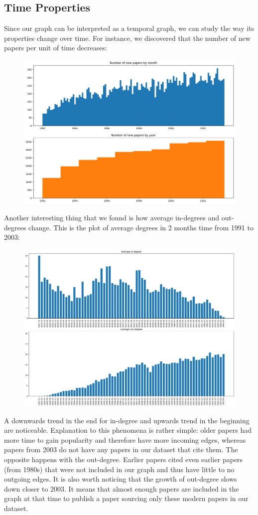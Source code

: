 \documentclass{article}
\newcommand\tab[1][1cm]{\hspace*{#1}}
\begin{document}
\subsection{Time Properties}
\tab Since our graph can be interpreted as a temporal graph, we can study the way its properties change over time. For instance, we discovered that the number of new papers per unit of time decreases:
\begin{figure}[h]
\centering
\includegraphics[width=0.9\linewidth]{new_papers_over_time.png}
\end{figure}
\newpage
Another interesting thing that we found is how average in-degrees and out-degrees change. This is the plot of average degrees in 2 months time from 1991 to 2003:
\begin{figure}[h]
\centering
\includegraphics[width=1\linewidth]{degrees_over_time.png}
\end{figure}
A downwards trend in the end for in-degree and upwards trend in the beginning are noticeable. Explanation to this phenomena is rather simple: older papers had more time to gain popularity and therefore have more incoming edges, whereas papers from 2003 do not have any papers in our dataset that cite them. The opposite happens with the out-degree. Earlier papers cited even earlier papers (from 1980s) that were not included in our graph and thus have little to no outgoing edges. It is also worth noticing that the growth of out-degree slows down closer to 2003. It means that almost enough papers are included in the graph at that time to publish a paper sourcing only these modern papers in our dataset.
\end{document}
